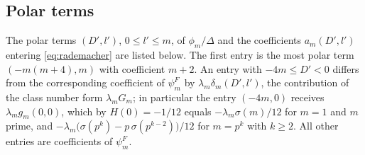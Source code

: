 \documentclass[11pt]{amsart}
\theoremstyle{definition}
\begin{document}
\subsection*{Polar terms}
The polar terms $(D',l')$, $0\le l'\le m$, of $\phi_m/\Delta$ and the coefficients $a_m(D',l')$ entering \eqref{eq:rademacher} are listed below. The first entry is the most polar term $(-m(m+4),m)$ with coefficient $m+2$. An entry with $-4m\le D'<0$ differs from the corresponding coefficient of $\psi^F_m$ by $\lambda_m\delta_m(D',l')$, the contribution of the class number form $\lambda_mG_m$; in particular the entry $(-4m,0)$ receives $\lambda_m g_m(0,0)$, which by $H(0)=-1/12$ equals $-\lambda_m\sigma(m)/12$ for $m=1$ and $m$ prime, and $-\lambda_m\bigl(\sigma(p^k)-p\,\sigma(p^{k-2})\bigr)/12$ for $m=p^k$ with $k\ge2$. All other entries are coefficients of $\psi^F_m$.

\medskip
\end{document}

